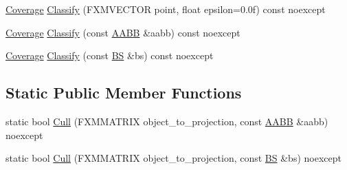 \begin{DoxyCompactItemize}
\item 
\hyperlink{namespacemage_aa9fe157e5a578a103160266df8cccb0a}{Coverage} \hyperlink{structmage_1_1_view_frustum_abece0092c43d40a2f891d2069130bfd0}{Classify} (F\+X\+M\+V\+E\+C\+T\+OR point, float epsilon=0.\+0f) const noexcept
\item 
\hyperlink{namespacemage_aa9fe157e5a578a103160266df8cccb0a}{Coverage} \hyperlink{structmage_1_1_view_frustum_a2c8ac9e080897aa02902d383e64a50e7}{Classify} (const \hyperlink{structmage_1_1_a_a_b_b}{A\+A\+BB} \&aabb) const noexcept
\item 
\hyperlink{namespacemage_aa9fe157e5a578a103160266df8cccb0a}{Coverage} \hyperlink{structmage_1_1_view_frustum_ad614c4948b6a99174d9aeac5dd5825f5}{Classify} (const \hyperlink{structmage_1_1_b_s}{BS} \&bs) const noexcept
\end{DoxyCompactItemize}
\subsection*{Static Public Member Functions}
\begin{DoxyCompactItemize}
\item 
static bool \hyperlink{structmage_1_1_view_frustum_a426fbed6bc71bd195edda01e5c3b2c3f}{Cull} (F\+X\+M\+M\+A\+T\+R\+IX object\+\_\+to\+\_\+projection, const \hyperlink{structmage_1_1_a_a_b_b}{A\+A\+BB} \&aabb) noexcept
\item 
static bool \hyperlink{structmage_1_1_view_frustum_ae07812a46d8c5058267a35b154b603c5}{Cull} (F\+X\+M\+M\+A\+T\+R\+IX object\+\_\+to\+\_\+projection, const \hyperlink{structmage_1_1_b_s}{BS} \&bs) noexcept
\end{DoxyCompactItemize}

